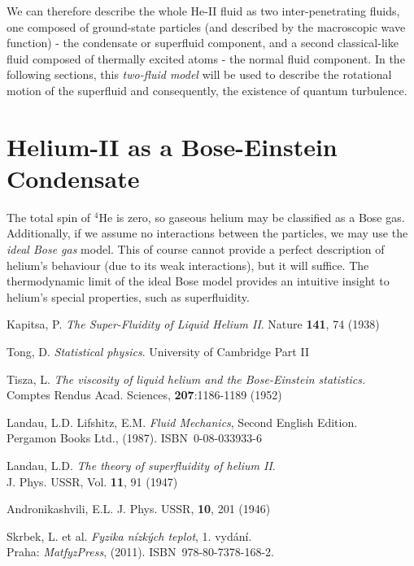 \documentclass[a4paper, 12pt]{report}
\newcommand{\He}{{}^4\mathrm{He}}
\newcommand{\<}{\langle}
\renewcommand{\>}{\rangle}
\begin{document}
We can therefore describe the whole He-II fluid as two inter-penetrating fluids, one composed of ground-state particles (and described by the macroscopic wave function) - the condensate or superfluid component, and a second classical-like fluid composed of thermally excited atoms - the normal fluid component. In the following sections, this \emph{two-fluid model} will be used to describe the rotational motion of the superfluid and consequently, the existence of quantum turbulence.

\newpage

\section{Helium-II as a Bose-Einstein Condensate}
The total spin of $\He$ is zero, so gaseous helium may be classified as a Bose gas. Additionally, if we assume no interactions between the particles, we may use the \textit{ideal Bose gas} model. This of course cannot provide a perfect description of helium's behaviour (due to its weak interactions), but it will suffice. The thermodynamic limit of the ideal Bose model provides an intuitive insight to helium's special properties, such as superfluidity.






\def\bibname{Bibliography}
\begin{thebibliography}{99}
	\addcontentsline{toc}{chapter}{\bibname}
	
	{\sc Kapitsa, P.}
	\emph{The Super-Fluidity of Liquid Helium II}.
	Nature \textbf{141}, 74 (1938)
	
	{\sc Tong, D.}
	\emph{Statistical physics}.
	University of Cambridge Part II
	
	{\sc Tisza, L.}
	\emph{The viscosity of liquid helium and the Bose-Einstein statistics.}\\
	Comptes Rendus Acad. Sciences, \textbf{207}:1186-1189 (1952)
	
	{\sc Landau, L.D.}  {\sc Lifshitz, E.M.}
	\emph{Fluid Mechanics}, Second English Edition.\\
	Pergamon Books Ltd., (1987). \mbox{ISBN~0-08-033933-6}
	
	{\sc Landau, L.D.}
	\emph{The theory of superfluidity of helium II}.\\
	J. Phys. USSR, Vol. \textbf{11}, 91 (1947)
	
	{\sc Andronikashvili, E.L.}
	J. Phys. USSR, \textbf{10}, 201 (1946)
	
	
	{\sc Skrbek, L.} et al.
	\emph{Fyzika nízkých teplot}, 1. vydání.\\
	Praha: {\sl MatfyzPress}, (2011). \mbox{ISBN~978-80-7378-168-2}.
	
	
	
	
\end{thebibliography}
\end{document}
